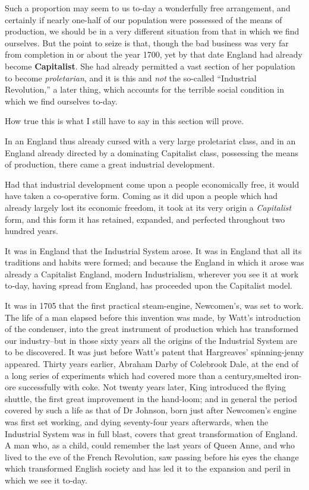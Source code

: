 \documentclass{book}
\newcommand\mdstrong[1]{\textbf{#1}}
\begin{document}
Such a proportion may seem to us to-day a wonderfully free arrangement, and certainly if nearly one-half of our population were possessed of the means of production, we should be in a very different situation from that in which we find ourselves. But the point to seize is that, though the bad business was very far from completion in or about the year 1700, yet by that date England had already become \mdstrong{Capitalist}. She had already permitted a vast section of her population to become \emph{proletarian}, and it is this and \emph{not} the so-called “Industrial Revolution,” a later thing, which accounts for the terrible social condition in which we find ourselves to-day.

How true this is what I still have to say in this section will prove.

In an England thus already cursed with a very large proletariat class, and in an England already directed by a dominating Capitalist class, possessing the means of production, there came a great industrial development.

Had that industrial development come upon a people economically free, it would have taken a co-operative form. Coming as it did upon a people which had already largely lost its economic freedom, it took at its very origin a \emph{Capitalist} form, and this form it has retained, expanded, and perfected throughout two hundred years.

It was in England that the Industrial System arose. It was in England that all its traditions and habits were formed; and because the England in which it arose was already a Capitalist England, modern Industrialism, wherever you see it at work to-day, having spread from England, has proceeded upon the Capitalist model.

It was in 1705 that the first practical steam-engine, Newcomen’s, was set to work. The life of a man elapsed before this invention was made, by Watt’s introduction of the condenser, into the great instrument of production which has transformed our industry–but in those sixty years all the origins of the Industrial System are to be discovered. It was just before Watt’s patent that Hargreaves’ spinning-jenny appeared. Thirty years earlier, Abraham Darby of Colebrook Dale, at the end of a long series of experiments which had covered more than a century,smelted iron-ore successfully with coke. Not twenty years later, King introduced the flying shuttle, the first great improvement in the hand-loom; and in general the period covered by such a life as that of Dr Johnson, born just after Newcomen’s engine was first set working, and dying seventy-four years afterwards, when the Industrial System was in full blast, covers that great transformation of England. A man who, as a child, could remember the last years of Queen Anne, and who lived to the eve of the French Revolution, saw passing before his eyes the change which transformed English society and has led it to the expansion and peril in which we see it to-day.
\end{document}
